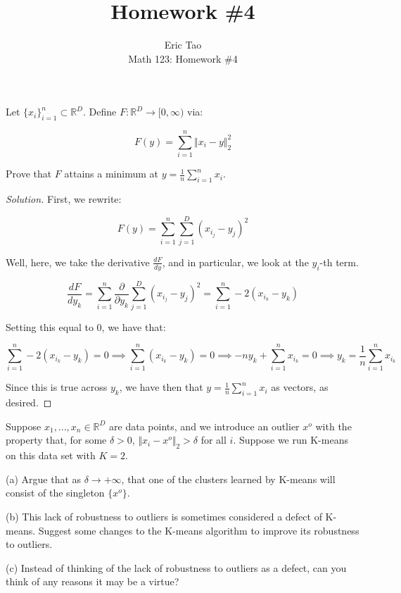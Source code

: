 \documentclass[10pt]{article}
\newenvironment{problem}[2][]{\begin{trivlist}
\item[\hskip \labelsep {\bfseries #1}\hskip \labelsep {\bfseries #2.}]}{\end{trivlist}}
\begin{document}
 
\title{Homework \#4}
\author{Eric Tao\\
Math 123: Homework \#4}
\maketitle

\begin{problem}{Question 1}

Let $\{ x_i \}_{i=1}^n \subset \mathbb{R}^D$. Define $F: \mathbb{R}^D \to [0,\infty)$ via:

$$ F(y) = \sum_{i=1}^n \Vert x_i - y \Vert_2^2$$

Prove that $F$ attains a minimum at $y = \frac{1}{n} \sum_{i=1}^n x_i$.
\end{problem}
\begin{proof}[Solution]

First, we rewrite:

$$F(y) = \sum_{i=1}^n \sum_{j=1}^D (x_{i_j} - y_j)^2$$

Well, here, we take the derivative $\frac{dF}{dy}$, and in particular, we look at the $y_i$-th term. 

$$ \frac{dF}{dy_k} =  \sum_{i=1}^n \frac{\partial}{\partial y_k} \sum_{j=1}^D  (x_{i_j} - y_j)^2 = \sum_{i=1}^n -2(x_{i_k} -  y_k) $$

Setting this equal to 0, we have that:

$$  \sum_{i=1}^n -2(x_{i_k} - y_k)  = 0 \implies \sum_{i=1}^n (x_{i_k} - y_k)  = 0  \implies - n y_k + \sum_{i=1}^n x_{i_k} = 0 \implies y_k = \frac{1}{n}  \sum_{i=1}^n x_{i_k} $$

Since this is true across $y_k$, we have then that $y = \frac{1}{n} \sum_{i=1}^n x_i$ as vectors, as desired.

\end{proof}

\begin{problem}{Question 2}

Suppose $x_1,...,x_n \in \mathbb{R}^D$ are data points, and we introduce an outlier $x^o$ with the property that, for some $\delta > 0$, $\Vert x_i  - x^o \Vert_2 > \delta$ for all $i$. Suppose we run K-means on this data set with $K = 2$.

(a) Argue that as $\delta \to + \infty$, that one of the clusters learned by K-means will consist of the singleton $\{ x^o \}$.

(b) This lack of robustness to outliers is sometimes considered a defect of K-means. Suggest some changes to the K-means algorithm to improve its robustness to outliers.

(c) Instead of thinking of the lack of robustness to outliers as a defect, can you think of any reasons it may be a virtue?

\end{problem}
\end{document}
